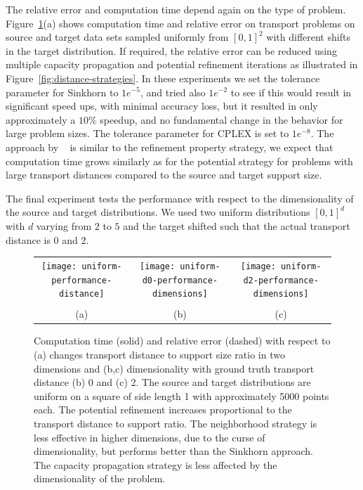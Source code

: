 \documentclass[twoside,11pt]{article}
\begin{document}
The relative error and computation time depend again on the type of problem.
Figure~\ref{fig:dimensions}(a) shows computation time and relative error
on transport problems on source and target data sets sampled uniformly from
$[0,1]^2$ with different shifts in the target distribution. If required, the
relative error can be reduced using multiple capacity propagation and potential
refinement iterations as illustrated in Figure~\ref{fig:distance-strategies}.
In these experiments we set the tolerance parameter for Sinkhorn to $1e^{-5}$, and
tried also $1e^{-2}$ to see if this would result in significant speed ups, with
minimal accuracy loss, but it resulted in only approximately a $10\%$ speedup,
and no fundamental change in the behavior for large problem sizes. The
tolerance parameter for CPLEX is set to $1e^{-8}$. The approach by
~\citet{schmitzer2015sparse} is similar to the refinement property strategy, we
expect that computation time grows similarly as for the potential strategy for
problems with large transport distances compared to the source and target
support size.

The final experiment tests the performance with respect to the dimensionality of
the source and target distributions. We used two uniform distributions $[0,1]^d$
with $d$ varying from $2$ to $5$ and the target shifted such that the actual
transport distance is 0 and 2.
\begin{figure}[htb]
\centering
\begin{tabular}{ccc}
\texttt{[image: uniform-performance-distance]} &
\texttt{[image: uniform-d0-performance-dimensions]} &
\texttt{[image: uniform-d2-performance-dimensions]} \\
                       \vspace{-0.2in} \\
                       (a) & (b)  & (c)
\end{tabular}
  \vspace{-0.1in}
\caption{
\label{fig:dimensions}
Computation time (solid) and relative error (dashed) with respect to (a)
changes transport distance to support size ratio in two dimensions and (b,c)
dimensionality with ground truth transport distance (b) 0 and (c) 2. The source
and target distributions are uniform on a square of side length 1 with
approximately 5000 points each. The potential refinement increases proportional
to the transport distance to support ratio. The neighborhood strategy is less
effective in higher dimensions, due to the curse of dimensionality, but
performs better than the Sinkhorn approach. The capacity propagation strategy
is less affected by the dimensionality of the problem. }  
\end{figure}
\end{document}
